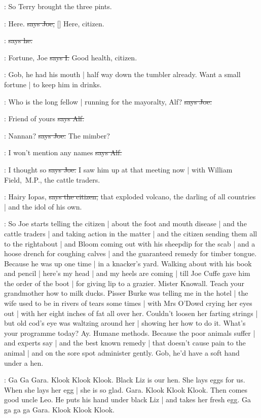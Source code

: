 \Nq:
So Terry brought the three pints.

\joe:
Here.
\sout{says Joe,}
[]
Here,
citizen.

\citizen:
\sout{says he.}

:
Fortune,
Joe
\sout{says I.}
Good health,
citizen.

\Nq:
Gob,
he had his mouth |
half way down the tumbler already.
Want a small fortune |
to keep him in drinks.

\joe:
Who is the long fellow |
running for the mayoralty,
Alf?
\sout{says Joe.}

\bergan:
Friend of yours
\sout{says Alf.}

\joe:
Nannan?
\sout{says Joe.}
The mimber?

\bergan:
I won't mention any names
\sout{says Alf.}

\joe:
I thought so
\sout{says Joe.}
I saw him up at that meeting now |
with William Field,~M.P.,
the cattle traders.

\citizen:
Hairy Iopas,
\sout{says the citizen,}
that exploded volcano,
the darling of all countries |
and the idol of his own.

\Nq:
So Joe starts telling the citizen |
about the foot and mouth disease |
and the cattle traders |
and taking action in the matter |
and the citizen sending them all to the rightabout |
and Bloom coming out with his sheepdip for the scab |
and a hoose drench for coughing calves |
and the guaranteed remedy for timber tongue.
Because he was up one time |
in a knacker's yard.
Walking about with his book and pencil |
here's my head |
and my heels are coming |
till Joe Cuffe gave him the order of the boot |
for giving lip to a grazier.
Mister Knowall.
Teach your grandmother how to milk ducks.
Pisser Burke was telling me in the hotel  |
the wife used to be in rivers of tears some times |
with Mrs O'Dowd crying her eyes out |
with her eight inches of fat all over her.
Couldn't loosen her farting strings |
but old cod's eye was waltzing around her |
showing her how to do it.
What's your programme today?
Ay.
Humane methods.
Because the poor animals suffer |
and experts say |
and the best known remedy |
that doesn't cause pain to the animal |
and on the sore spot administer gently.
Gob,
he'd have a soft hand under a hen.

:
Ga Ga Gara.
Klook Klook Klook.
Black Liz is our hen.
She lays eggs for us.
When she lays her egg |
she is so glad.
Gara.
Klook Klook Klook.
Then comes good uncle Leo.
He puts his hand under black Liz |
and takes her fresh egg.
Ga ga ga ga Gara.
Klook Klook Klook.

